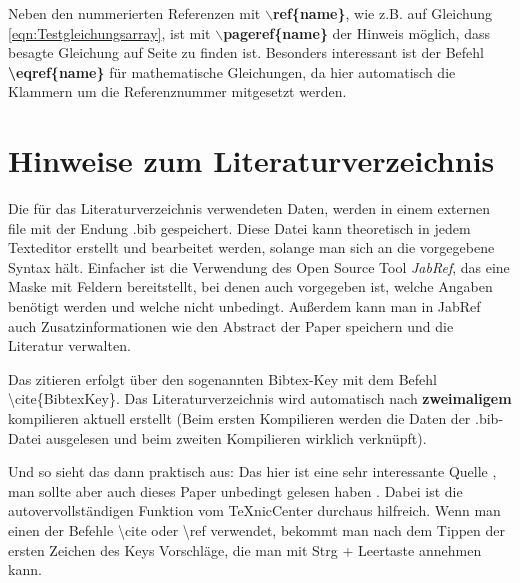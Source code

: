 			Neben den nummerierten Referenzen mit \textbf{$\backslash$ref\{name\}}, wie z.B. auf Gleichung
			\ref{eqn:Testgleichungsarray}, ist mit \textbf{$\backslash$pageref\{name\}} der Hinweis möglich, dass
			besagte Gleichung auf Seite \pageref{eqn:Testgleichungsarray} zu finden ist. Besonders interessant ist 
			der Befehl \textbf{\textbackslash eqref\{name\}} für mathematische Gleichungen, da hier automatisch die Klammern um die
			Referenznummer mitgesetzt werden.
			
		
		\section {Hinweise zum Literaturverzeichnis}
			
			Die für das Literaturverzeichnis verwendeten Daten, werden in einem externen file mit der Endung .bib gespeichert. Diese Datei kann theoretisch in jedem Texteditor erstellt und bearbeitet werden, solange man sich an die vorgegebene Syntax hält. 
			Einfacher ist die Verwendung des Open Source Tool \emph{JabRef}, das eine Maske mit Feldern bereitstellt, bei denen auch vorgegeben ist, welche Angaben benötigt werden und welche nicht unbedingt. Außerdem kann man in JabRef auch Zusatzinformationen wie den Abstract der Paper speichern und die Literatur verwalten.
			
			Das zitieren erfolgt über den sogenannten Bibtex-Key mit dem Befehl \textbackslash cite\{BibtexKey\}. Das Literaturverzeichnis wird automatisch nach \textbf{zweimaligem} kompilieren aktuell erstellt (Beim ersten Kompilieren werden die Daten der .bib-Datei ausgelesen und beim zweiten Kompilieren wirklich verknüpft). 
			
			
			Und so sieht das dann praktisch aus: Das hier ist eine sehr interessante Quelle \cite{Abel2000}, man sollte aber auch dieses Paper unbedingt gelesen haben \cite{Marquardt2005}. Dabei ist die autovervollständigen Funktion vom TeXnicCenter durchaus hilfreich. Wenn man einen der Befehle \textbackslash cite oder \textbackslash ref verwendet, bekommt man nach dem Tippen der ersten Zeichen des Keys Vorschläge, die man mit Strg + Leertaste annehmen kann.


		